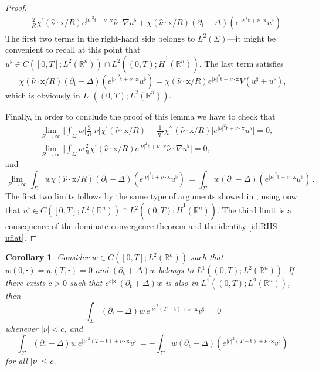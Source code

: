 \documentclass[10pt,a4paper]{amsart}
\newtheorem{corollary}[proposition]{Corollary}
\theoremstyle{remark}
\theoremstyle{definition}
\newcommand{\R}{\mathbb{R}}
\newcommand{\tm}{\mathrm{t}}
\newcommand{\x}{\mathrm{x}}
\begin{document}
\begin{proof}
\begin{align*}
- \frac{2}{R} \chi^\prime (\hat \nu \cdot \x/R) e^{|\nu|^2 \tm + \nu \cdot \x} \hat \nu \cdot \nabla u^\flat
+ \chi(\hat \nu \cdot \x/R) (\partial_{\tm}-\Delta)(e^{|\nu|^2 \tm + \nu \cdot \x} u^\flat)
\end{align*}
The first two terms in the right-hand side belongs to 
$L^2(\Sigma)$---it might be convenient to recall at this point that 
$u^\flat \in C([0, T]; L^2(\R^n))\cap L^2((0,T); \dot H^1(\R^n))$. The last term satisfies
\begin{equation}
\label{id:RHS-uflat}
\chi(\hat \nu \cdot \x/R) (\partial_{\tm}-\Delta)(e^{|\nu|^2 \tm + \nu \cdot \x} u^\flat) = \chi(\hat \nu \cdot \x/R) e^{|\nu|^2 \tm + \nu \cdot \x} V (u^\sharp + u^\flat),
\end{equation}
which is obviously in $L^1((0,T); L^2(\R^n))$.

Finally, in order to conclude the proof of this lemma we have to check
that
\begin{align*}
& \lim_{R\to \infty} \Big| \int_{\Sigma} w \Big[\frac{2}{R} |\nu| \chi^\prime (\hat \nu \cdot \x/R) + \frac{1}{R^2} \chi^{\prime \prime} (\hat \nu \cdot \x/R) \Big] e^{|\nu|^2 \tm + \nu \cdot \x} u^\flat \Big| = 0,\\
& \lim_{R\to \infty} \Big| \int_{\Sigma} w \frac{2}{R} \chi^\prime (\hat \nu \cdot \x/R) e^{|\nu|^2 \tm + \nu \cdot \x} \hat \nu \cdot \nabla u^\flat \Big| = 0,
\end{align*}
and
\[\lim_{R\to \infty} \int_{\Sigma} w \chi(\hat \nu \cdot \x/R) (\partial_{\tm}-\Delta)(e^{|\nu|^2 \tm + \nu \cdot \x} u^\flat) \, = \int_{\Sigma} w (\partial_{\tm}-\Delta)(e^{|\nu|^2 \tm + \nu \cdot \x} u^\flat) \, .  \]
The first two limits follows by the same type of arguments showed in , using 
now that $u^\flat \in C([0, T]; L^2(\R^n))\cap L^2((0,T); \dot H^1(\R^n))$.
The third limit is a consequence of the dominate convergence theorem and the identity 
\eqref{id:RHS-uflat}.
\end{proof}

\begin{corollary}\label{cor:vsharp-vflat}\sl
Consider $w \in C([0, T] ; L^{2}(\mathbb{R}^{n}))$ such that 
$w (0, \centerdot) = w(T, \centerdot)=0$ 
and $(\partial_{\tm}+\Delta)w $ belongs to $ L^{1}((0, T) ; L^{2}(\mathbb{R}^{n}))$.
If there exists $c > 0$ such that 
$e^{c|\x|} (\partial_{\tm}+\Delta)w $ is also in $ L^{1}((0, T) ; L^{2}(\mathbb{R}^{n}))$, then
\[ \int_{\Sigma}( \partial_{\tm}-\Delta) w \, e^{|\nu|^2 (T - \tm) + \nu \cdot \x} v^\sharp \, = 0 \]
whenever $|\nu| < c$, and
\[ \int_{\Sigma}( \partial_{\tm}-\Delta) w \, e^{|\nu|^2 (T - \tm) + \nu \cdot \x} v^\flat \, = - \int_{\Sigma} w ( \partial_{\tm}+\Delta)(e^{|\nu|^2 (T - \tm) + \nu \cdot \x} v^\flat) \, \]
for all $|\nu| \leq c$.
\end{corollary}
\end{document}
